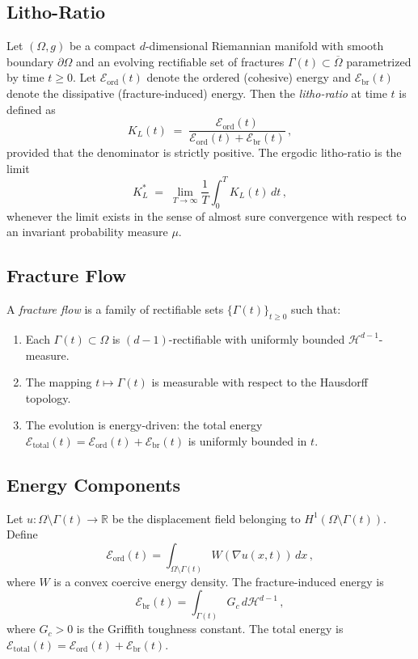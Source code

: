 \subsection*{Litho-Ratio}
\begin{definition}
Let $(\Omega, g)$ be a compact $d$-dimensional Riemannian manifold with smooth
boundary $\partial\Omega$ and an evolving rectifiable set of fractures
$\Gamma(t) \subset \overline{\Omega}$ parametrized by time $t \geq 0$. Let
$\mathcal{E}_{\mathrm{ord}}(t)$ denote the ordered (cohesive) energy and
$\mathcal{E}_{\mathrm{br}}(t)$ denote the dissipative (fracture-induced)
energy. Then the \emph{litho-ratio} at time $t$ is defined as
\[
  K_L(t) \;=\; \frac{\mathcal{E}_{\mathrm{ord}}(t)}
  {\mathcal{E}_{\mathrm{ord}}(t) + \mathcal{E}_{\mathrm{br}}(t)} \,,
\]
provided that the denominator is strictly positive. The ergodic litho-ratio is
the limit
\[
  K_L^* \;=\; \lim_{T \to \infty} \frac{1}{T}
  \int_0^T K_L(t)\, dt \,,
\]
whenever the limit exists in the sense of almost sure convergence with respect
to an invariant probability measure $\mu$.
\end{definition}

\subsection*{Fracture Flow}
\begin{definition}
A \emph{fracture flow} is a family of rectifiable sets
$\{\Gamma(t)\}_{t \geq 0}$ such that:
\begin{enumerate}[label=(F\arabic*)]
  \item Each $\Gamma(t) \subset \Omega$ is $(d-1)$-rectifiable with uniformly
  bounded $\mathcal{H}^{d-1}$-measure.
  \item The mapping $t \mapsto \Gamma(t)$ is measurable with respect to the
  Hausdorff topology.
  \item The evolution is energy-driven: the total energy
  $\mathcal{E}_{\mathrm{total}}(t) = \mathcal{E}_{\mathrm{ord}}(t) +
  \mathcal{E}_{\mathrm{br}}(t)$ is uniformly bounded in $t$.
\end{enumerate}
\end{definition}

\subsection*{Energy Components}
\begin{definition}
Let $u : \Omega \setminus \Gamma(t) \to \mathbb{R}$ be the displacement field
belonging to $H^1(\Omega \setminus \Gamma(t))$. Define
\[
\mathcal{E}_{\mathrm{ord}}(t) = \int_{\Omega \setminus \Gamma(t)} 
  W(\nabla u(x,t)) \, dx \,,
\]
where $W$ is a convex coercive energy density. The fracture-induced energy is
\[
\mathcal{E}_{\mathrm{br}}(t) = \int_{\Gamma(t)} G_c \, d\mathcal{H}^{d-1} \,,
\]
where $G_c > 0$ is the Griffith toughness constant. The total energy is
$\mathcal{E}_{\mathrm{total}}(t) = \mathcal{E}_{\mathrm{ord}}(t) +
\mathcal{E}_{\mathrm{br}}(t)$.
\end{definition}

